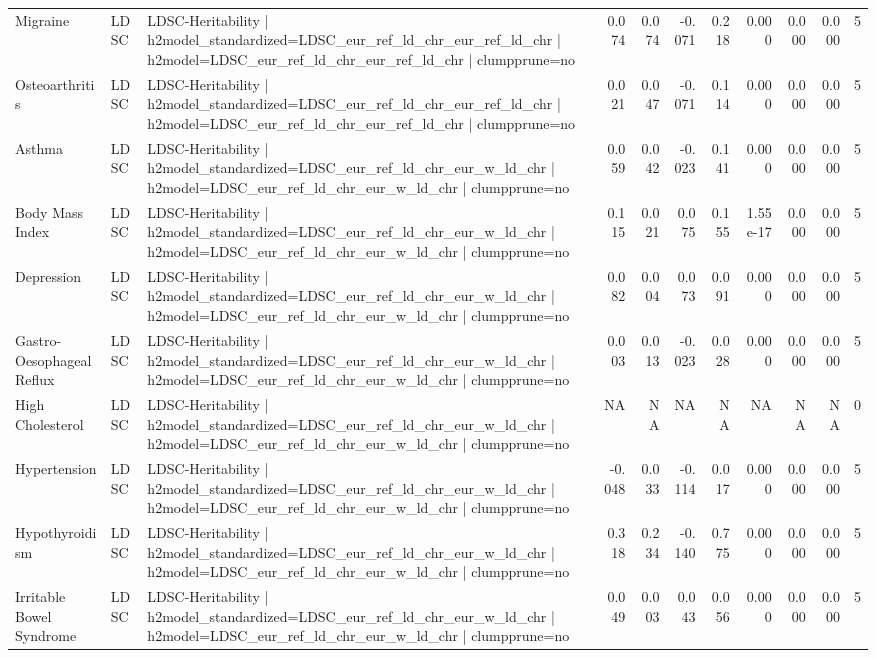 \begin{landscape}
\begin{longtable}{p{2.4cm}p{1.8cm}p{6.0cm}rrrrrrrr}
Migraine & LDSC & LDSC-Heritability | h2model\_standardized=LDSC\_eur\_ref\_ld\_chr\_eur\_ref\_ld\_chr | h2model=LDSC\_eur\_ref\_ld\_chr\_eur\_ref\_ld\_chr | clumpprune=no & 0.074 & 0.074 & -0.071 & 0.218 & 0.000 & 0.000 & 0.000 & 5 \\
Osteoarthritis & LDSC & LDSC-Heritability | h2model\_standardized=LDSC\_eur\_ref\_ld\_chr\_eur\_ref\_ld\_chr | h2model=LDSC\_eur\_ref\_ld\_chr\_eur\_ref\_ld\_chr | clumpprune=no & 0.021 & 0.047 & -0.071 & 0.114 & 0.000 & 0.000 & 0.000 & 5 \\
Asthma & LDSC & LDSC-Heritability | h2model\_standardized=LDSC\_eur\_ref\_ld\_chr\_eur\_w\_ld\_chr | h2model=LDSC\_eur\_ref\_ld\_chr\_eur\_w\_ld\_chr | clumpprune=no & 0.059 & 0.042 & -0.023 & 0.141 & 0.000 & 0.000 & 0.000 & 5 \\
Body Mass Index & LDSC & LDSC-Heritability | h2model\_standardized=LDSC\_eur\_ref\_ld\_chr\_eur\_w\_ld\_chr | h2model=LDSC\_eur\_ref\_ld\_chr\_eur\_w\_ld\_chr | clumpprune=no & 0.115 & 0.021 & 0.075 & 0.155 & 1.55e-17 & 0.000 & 0.000 & 5 \\
Depression & LDSC & LDSC-Heritability | h2model\_standardized=LDSC\_eur\_ref\_ld\_chr\_eur\_w\_ld\_chr | h2model=LDSC\_eur\_ref\_ld\_chr\_eur\_w\_ld\_chr | clumpprune=no & 0.082 & 0.004 & 0.073 & 0.091 & 0.000 & 0.000 & 0.000 & 5 \\
Gastro-Oesophageal Reflux & LDSC & LDSC-Heritability | h2model\_standardized=LDSC\_eur\_ref\_ld\_chr\_eur\_w\_ld\_chr | h2model=LDSC\_eur\_ref\_ld\_chr\_eur\_w\_ld\_chr | clumpprune=no & 0.003 & 0.013 & -0.023 & 0.028 & 0.000 & 0.000 & 0.000 & 5 \\
High Cholesterol & LDSC & LDSC-Heritability | h2model\_standardized=LDSC\_eur\_ref\_ld\_chr\_eur\_w\_ld\_chr | h2model=LDSC\_eur\_ref\_ld\_chr\_eur\_w\_ld\_chr | clumpprune=no & NA & NA & NA & NA & NA & NA & NA & 0 \\
Hypertension & LDSC & LDSC-Heritability | h2model\_standardized=LDSC\_eur\_ref\_ld\_chr\_eur\_w\_ld\_chr | h2model=LDSC\_eur\_ref\_ld\_chr\_eur\_w\_ld\_chr | clumpprune=no & -0.048 & 0.033 & -0.114 & 0.017 & 0.000 & 0.000 & 0.000 & 5 \\
Hypothyroidism & LDSC & LDSC-Heritability | h2model\_standardized=LDSC\_eur\_ref\_ld\_chr\_eur\_w\_ld\_chr | h2model=LDSC\_eur\_ref\_ld\_chr\_eur\_w\_ld\_chr | clumpprune=no & 0.318 & 0.234 & -0.140 & 0.775 & 0.000 & 0.000 & 0.000 & 5 \\
Irritable Bowel Syndrome & LDSC & LDSC-Heritability | h2model\_standardized=LDSC\_eur\_ref\_ld\_chr\_eur\_w\_ld\_chr | h2model=LDSC\_eur\_ref\_ld\_chr\_eur\_w\_ld\_chr | clumpprune=no & 0.049 & 0.003 & 0.043 & 0.056 & 0.000 & 0.000 & 0.000 & 5 \\

\end{longtable}
\end{landscape}
